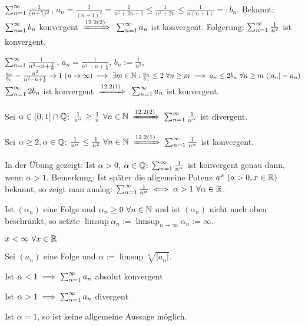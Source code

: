 \documentclass[a4paper,oneside,DIV15,BCOR12mm]{scrbook}
\begin{document}
\begin{beispiele}
\item $\sum_{n=1}^{\infty}{\frac{1}{(n+1)^2}}$, $a_n=\frac{1}{(n+1)^2} = \frac{1}{n^2+2n+1} \le \frac{1}{n^2+2n} \le \frac{1}{n(n+1)} =: b_n$. Bekannt: $\sum_{n=1}^{\infty}{b_n}$ konvergent $\folgtnach{12.2(2)}$ $\sum_{n=1}^{\infty}{a_n}$ ist konvergent. Folgerung: $\sum_{n=1}^{\infty}{\frac{1}{n^2}}$ ist konvergent.
\item $\sum_{n=1}^{\infty}{\frac{1}{n^2-n+\frac{1}{8}}}$, $a_n=\frac{1}{n^2-n+\frac{1}{8}}$, $b_n:=\frac{1}{n^2}$, $\frac{a_n}{b_n} = \frac{n^2}{n^2-n+\frac{1}{8}} \to 1 \ (n\to\infty) \folgt \exists m\in\MdN: \frac{a_n}{b_n} \le 2\ \forall n\ge m \folgt a_n \le 2 b_n \ \forall n\ge m\ (|a_n|=a_n)$\\
$\sum_{n=1}^{\infty}{2b_n}$ ist konvergent $\folgtnach{12.2(1)}$ $\sum_{n=1}^{\infty}{a_n}$ ist konvergent.
\item Sei $\alpha \in (0,1] \cap \mathbb{Q}$: $\frac{1}{n^\alpha} \ge \frac{1}{n} \ \forall n\in\MdN \folgtnach{12.2(2)} \reihe{\frac{1}{n^\alpha}}$ ist divergent.
\item Sei $\alpha \ge 2, \alpha \in \mathbb{Q}$: $\frac{1}{n^\alpha} \le \frac{1}{n^2} \ \forall n\in\MdN \folgtnach{12.2(1)} \reihe{\frac{1}{n^\alpha}}$ ist konvergent.
\item In der Übung gezeigt: Ist $\alpha > 0$, $\alpha \in\mathbb{Q}$: $\sum_{n=1}^{\infty}{\frac{1}{n^\alpha}}$ ist konvergent genau dann, wenn $\alpha > 1$. Bemerkung: Ist später die allgemeine Potenz $a^x \ (a>0,x\in\mathbb{R})$ bekannt, so zeigt man analog: $\sum_{n=1}^{\infty}{\frac{1}{n^\alpha}} \iff \alpha > 1 \ \forall \alpha\in\mathbb{R}$.
\end{beispiele}

\begin{definition}
Ist $(\alpha_n)$ eine Folge und $\alpha_n \ge 0 \ \forall n\in\mathbb{N}$ und ist $(\alpha_n)$ nicht nach oben beschränkt, so setzte $\limsup \alpha_n := \limsup_{n\to\infty} \alpha_n := \infty$.
\end{definition}
\begin{vereinbarung}
$x < \infty \ \forall x \in\mathbb{R}$
\end{vereinbarung}

\begin{satz}[Wurzelkriterium]
Sei $(a_n)$ eine Folge und $\alpha := \limsup \sqrt[n]{|a_n|}$.
\begin{liste}
 \item Ist $\alpha<1 \implies \sum_{n=1}^{\infty}{a_n}$ absolut konvergent
 \item Ist $\alpha>1 \implies \sum_{n=1}^{\infty}{a_n}$ divergent
 \item Ist $\alpha=1$, so ist keine allgemeine Aussage möglich.
\end{liste}
\end{satz}
\end{document}
